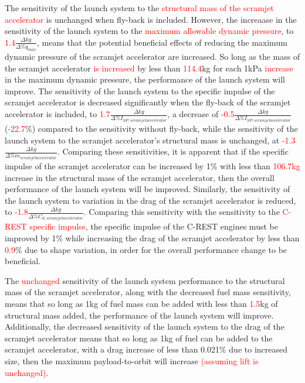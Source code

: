 The sensitivity of the launch system to the \textcolor{red}{structural mass of the scramjet accelerator} is unchanged when fly-back is included. However, the increaase in the sensitivity of the launch system to the \textcolor{red}{maximum allowable dynamic pressure}, to \textcolor{red}{1.4}$\frac{\Delta kg}{\Delta\%q_{max}}$, means that the potential beneficial effects of reducing the maximum dynamic pressure of the scramjet accelerator are increased. So long as the mass of the scramjet accelerator \textcolor{red}{is increased} by less than \textcolor{red}{114.4}kg for each 1kPa \textcolor{red}{increase} in the maximum dynamic pressure, the performance of the launch system will improve.
 The sensitivity of the launch system to the specific impulse of the scramjet accelerator is decreased significantly when the fly-back of the scramjet accelerator is included, to \textcolor{red}{1.7}$\frac{\Delta kg}{\Delta\%I_{SP,scramjet accelerator}}$, a decrease of \textcolor{red}{-0.5}$\frac{\Delta kg}{\Delta\%I_{SP,scramjet accelerator}}$ (\textcolor{red}{-22.7}\%) compared to the sensitivity without fly-back, while the sensitivity of the launch system to the scramjet accelerator's structural mass is unchanged, at \textcolor{red}{-1.3}$\frac{\Delta kg}{\Delta\%m_{scramjet accelerator}}$. Comparing these sensitivities, it is apparent that if the specific impulse of the scramjet accelerator can be increased by 1\% with less than \textcolor{red}{106.7kg} increase in the structural mass of the scramjet accelerator, then the overall performance of the launch system will be improved.  
Similarly, the sensitivity of the launch system to variation in the drag of the scramjet accelerator is reduced, to \textcolor{red}{-1.8}$\frac{\Delta kg}{\Delta\%C_{d,scramjet accelerator}}$. Comparing this sensitivity with the sensitivity to the \textcolor{red}{C-REST specific impulse}, the specific impulse of the C-REST engines must be improved by 1\% while increasing the drag of the scramjet accelerator by less than \textcolor{red}{0.9}\% due to shape variation, in order for the overall performance change to be beneficial. 

The \textcolor{red}{unchanged} sensitivity of the launch system performance to the structural mass of the scramjet accelerator, along with the decreased fuel mass sensitivity, means that so long as 1kg of fuel mass can be added with less than \textcolor{red}{1.5}kg of structural mass added, the performance of the launch system will improve. Additionally, the decreased sensitivity of the launch system to the drag of the scramjet accelerator means that so long as 1kg of fuel can be added to the scramjet accelerator, with a drag increase of less than 0.021\% due to increased size, then the maximum payload-to-orbit will increase \textcolor{red}{(assuming lift is unchanged)}. 


